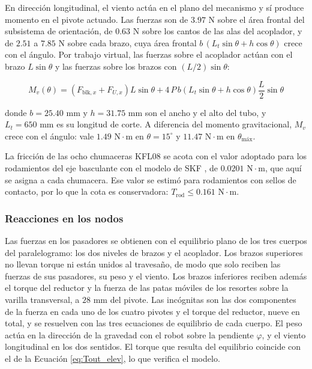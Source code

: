 \documentclass[../../General.tex]{subfiles}
\begin{document}
En dirección longitudinal, el viento actúa en el plano del mecanismo y sí produce momento en el pivote actuado. Las fuerzas son de $3.97\text{ N}$ sobre el área frontal del subsistema de orientación, de $0.63\text{ N}$ sobre los cantos de las alas del acoplador, y de $2.51$ a $7.85\text{ N}$ sobre cada brazo, cuya área frontal $b\,(L_t\sin\theta + h\cos\theta)$ crece con el ángulo. Por trabajo virtual, las fuerzas sobre el acoplador actúan con el brazo $L\sin\theta$ y las fuerzas sobre los brazos con $(L/2)\sin\theta$:

\begin{equation}\label{eq:Mv_elev}
    M_v(\theta) = \left(F_{\text{blk},x} + F_{U,x}\right) L\sin\theta + 4\,P\, b\left(L_t\sin\theta + h\cos\theta\right)\frac{L}{2}\sin\theta
\end{equation}

donde $b = 25.40\text{ mm}$ y $h = 31.75\text{ mm}$ son el ancho y el alto del tubo, y $L_t = 650\text{ mm}$ es su longitud de corte. A diferencia del momento gravitacional, $M_v$ crece con el ángulo: vale $1.49\text{ N}\cdot\text{m}$ en $\theta = 15^\circ$ y $11.47\text{ N}\cdot\text{m}$ en $\theta_{\text{máx}}$.

La fricción de las ocho chumaceras KFL08 se acota con el valor adoptado para los rodamientos del eje basculante con el modelo de SKF \citep{skf2020bearings}, de $0.0201\text{ N}\cdot\text{m}$, que aquí se asigna a cada chumacera. Ese valor se estimó para rodamientos con sellos de contacto, por lo que la cota es conservadora: $T_{\text{rod}} \leq 0.161\text{ N}\cdot\text{m}$.

\subsubsection{Reacciones en los nodos}\label{subsubsec:reacciones_elev}

Las fuerzas en los pasadores se obtienen con el equilibrio plano de los tres cuerpos del paralelogramo: los dos niveles de brazos y el acoplador. Los brazos superiores no llevan torque ni están unidos al travesaño, de modo que solo reciben las fuerzas de sus pasadores, su peso y el viento. Los brazos inferiores reciben además el torque del reductor y la fuerza de las patas móviles de los resortes sobre la varilla transversal, a $28\text{ mm}$ del pivote. Las incógnitas son las dos componentes de la fuerza en cada uno de los cuatro pivotes y el torque del reductor, nueve en total, y se resuelven con las tres ecuaciones de equilibrio de cada cuerpo. El peso actúa en la dirección de la gravedad con el robot sobre la pendiente $\varphi$, y el viento longitudinal en los dos sentidos. El torque que resulta del equilibrio coincide con el de la Ecuación \ref{eq:Tout_elev}, lo que verifica el modelo.
\end{document}
